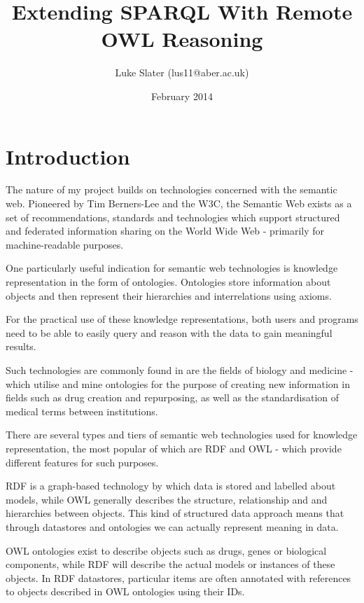 \documentclass{article}
\begin{document}
\setlength{\parskip}{\medskipamount}
\setlength{\parindent}{0pt}

\title{Extending SPARQL With Remote OWL Reasoning}
\author{Luke Slater (lus11@aber.ac.uk)}
\date{February 2014}

\maketitle

\pagebreak

\section{Introduction}

The nature of my project builds on technologies concerned with the semantic web.
Pioneered by Tim Berners-Lee and the W3C, the Semantic Web exists as a set of
recommendations, standards and technologies which support structured and
federated information sharing on the World Wide Web - primarily for
machine-readable purposes.

One particularly useful indication for semantic web technologies is knowledge
representation in the form of ontologies. Ontologies store information about
objects and then represent their hierarchies and interrelations using axioms.

For the practical use of these knowledge representations, both users and
programs need to be able to easily query and reason with the data to gain
meaningful results. 

Such technologies are commonly found in are the fields of biology and
medicine - which utilise and mine ontologies for the purpose of creating new
information in fields such as drug creation and repurposing, as well as the
standardisation of medical terms between institutions.

There are several types and tiers of semantic web technologies used for
knowledge representation, the most popular of which are RDF and OWL - which
provide different features for such purposes.

RDF is a graph-based technology by which data is stored and labelled about
models, while OWL generally describes the structure, relationship and and
hierarchies between objects. This kind of structured data approach means that
through datastores and ontologies we can actually represent meaning in data.

OWL ontologies exist to describe objects such as drugs, genes or biological
components, while RDF will describe the actual models or instances of these
objects. In RDF datastores, particular items are often annotated with references
to objects described in OWL ontologies using their IDs.
\end{document}

